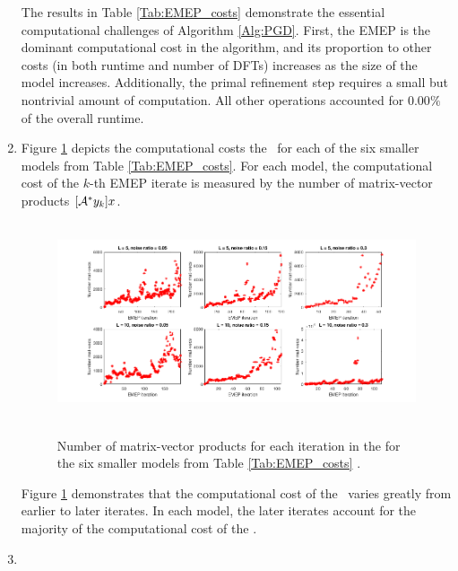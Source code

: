 \begin{enumerate}
The results in Table \ref{Tab:EMEP_costs} demonstrate the essential computational challenges of Algorithm \ref{Alg:PGD}.  First, the EMEP is the dominant computational cost in the algorithm, and its proportion to other costs (in both runtime and number of DFTs) increases as the size of the model increases.  Additionally, the primal refinement step requires a small but nontrivial amount of computation.  All other operations accounted for $0.00\%$ of the overall runtime. 





\item


Figure \ref{Fig:EMEP_costs_num_mat_vecs} depicts the computational costs the \emep \ for each of the six smaller models from Table \ref{Tab:EMEP_costs}.  For each model, the computational cost of the $k$-th EMEP iterate is measured by the number of matrix-vector products $[{\mathcal A}^*y_k]x$.

\begin{figure}[H]
\centering
\hbox{\hspace{-1.9cm} \includegraphics[scale=0.6]{EMEP_costs_num_mat_vecs} }\vspace{-0.4cm}
	\caption{Number of matrix-vector products for each iteration in the \emep for the six smaller models from Table \ref{Tab:EMEP_costs}	.}
\label{Fig:EMEP_costs_num_mat_vecs}
\end{figure}

Figure \ref{Fig:EMEP_costs_num_mat_vecs} demonstrates that the computational cost of the \emep \ varies greatly from earlier to later iterates.  In each model, the later iterates account for the majority of the computational cost of the \emep.  





\item


\end{enumerate}
